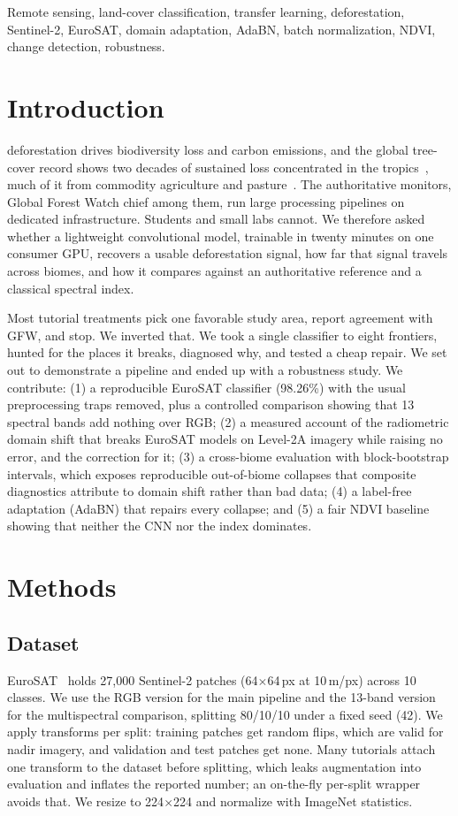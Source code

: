 \documentclass[journal]{IEEEtran}
\begin{document}
\begin{IEEEkeywords}
Remote sensing, land-cover classification, transfer learning, deforestation,
Sentinel-2, EuroSAT, domain adaptation, AdaBN, batch normalization, NDVI,
change detection, robustness.
\end{IEEEkeywords}

\section{Introduction}
 deforestation drives biodiversity loss and carbon
emissions, and the global tree-cover record shows two decades of sustained loss
concentrated in the tropics~\cite{hansen2013}, much of it from commodity
agriculture and pasture~\cite{curtis2018,fao2020}. The authoritative monitors,
Global Forest Watch chief among them, run large processing pipelines on dedicated
infrastructure. Students and small labs cannot. We therefore asked whether a
lightweight convolutional model, trainable in twenty minutes on one consumer GPU,
recovers a usable deforestation signal, how far that signal travels across biomes,
and how it compares against an authoritative reference and a classical spectral
index.

Most tutorial treatments pick one favorable study area, report agreement with GFW,
and stop. We inverted that. We took a single classifier to eight frontiers, hunted
for the places it breaks, diagnosed why, and tested a cheap repair. We set out to
demonstrate a pipeline and ended up with a robustness study. We contribute: (1) a
reproducible EuroSAT classifier (98.26\%) with the usual preprocessing traps
removed, plus a controlled comparison showing that 13 spectral bands add nothing
over RGB; (2) a measured account of the radiometric domain shift that breaks
EuroSAT models on Level-2A imagery while raising no error, and the correction for
it; (3) a cross-biome evaluation with
block-bootstrap intervals, which exposes reproducible out-of-biome collapses that
composite diagnostics attribute to domain shift rather than bad data; (4) a
label-free adaptation (AdaBN) that repairs every collapse; and (5) a fair NDVI
baseline showing that neither the CNN nor the index dominates.

\section{Methods}
\subsection{Dataset}
EuroSAT~\cite{helber2019} holds 27{,}000 Sentinel-2 patches (64$\times$64\,px at
10\,m/px) across 10 classes. We use the RGB version for the main pipeline and the
13-band version for the multispectral comparison, splitting 80/10/10 under a fixed
seed (42). We apply transforms per split: training patches get random flips, which
are valid for nadir imagery, and validation and test patches get none. Many
tutorials attach one transform to the dataset before splitting, which leaks
augmentation into evaluation and inflates the reported number; an on-the-fly
per-split wrapper avoids that. We resize to 224$\times$224 and normalize with
ImageNet statistics.
\end{document}
